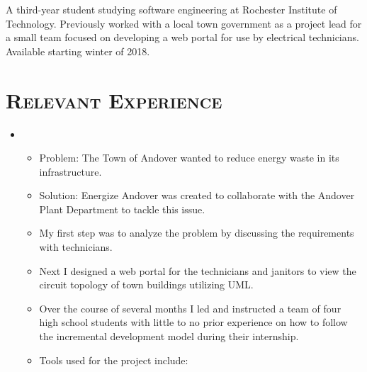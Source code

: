 \documentclass[10pt,letter,roman]{moderncv}
\begin{document}
\makecvtitle

\small{A third-year student studying software engineering at Rochester Institute of Technology. Previously worked with a local town government as a project lead for a small team focused on developing a web portal for use by electrical technicians. Available starting winter of 2018.}

\section{\textsc{Relevant Experience}}

\vspace{3pt}
\begin{itemize}

\item{}
  \begin{itemize}
    \item Problem: The Town of Andover wanted to reduce energy waste in its infrastructure.
    \item Solution: Energize Andover was created to collaborate with the Andover Plant Department to tackle this issue.
    \item	My first step was to analyze the problem by discussing the requirements with technicians.
    \item	Next I designed a web portal for the technicians and janitors to view the circuit topology of town buildings utilizing UML.
    \item	Over the course of several months I led and instructed a team of four high school students with little to no prior experience on how to follow the incremental development model during their internship.
    \item	Tools used for the project include:
    \begin{itemize}
    \end{itemize}
  \end{itemize}


\end{itemize}
\end{document}

